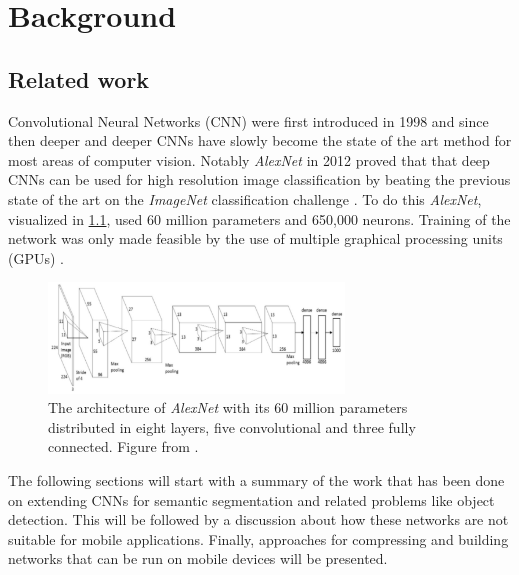 \documentclass{kththesis}
\newcommand{\bibentry}[1]{\parencite{#1}}
\begin{document}
\chapter{Background}
\section{Related work}
Convolutional Neural Networks (CNN) were first introduced in 1998
\bibentry{lecun1998gradient} and since then deeper and deeper CNNs have slowly
become the state of the art method for most areas of computer vision. Notably
\emph{AlexNet} \bibentry{krizhevsky2012imagenet} in 2012 proved that that deep
CNNs can be used for high resolution image classification by beating the
previous state of the art \bibentry{sanchez2011high} on the \emph{ImageNet}
classification challenge \bibentry{deng2009imagenet}. To do this \emph{AlexNet},
visualized in \cref{fig:AlexNet}, 
used 60 million parameters and 650,000 neurons. Training of the network was
only made feasible by the use of multiple graphical processing units (GPUs)
\bibentry{krizhevsky2012imagenet}.

\begin{figure}[h]
  \centering
  \includegraphics[width=0.7\textwidth]{AlexNet}
  \caption{The architecture of \textit{AlexNet} with its 60 million parameters
    distributed
    in eight layers, five convolutional and three fully connected. Figure from \textcite{krizhevsky2012imagenet}.}
  \label{fig:AlexNet}
  \end{figure}

The following sections will start with a summary of the work that has been done
on extending CNNs for semantic segmentation and related problems like
object detection. This will be followed by a discussion about how these networks
are not suitable for mobile applications. Finally, approaches for compressing
and building networks that can be run on mobile devices will be presented.
\end{document}
